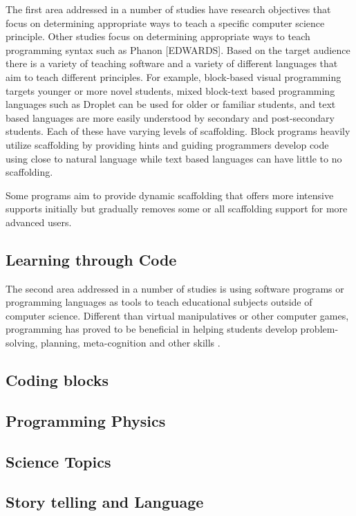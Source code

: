 \documentclass[12pt]{extarticle}
\begin{document}
The first area addressed in a number of studies have research objectives that focus on determining appropriate ways to teach a specific computer science principle.
Other studies focus on determining appropriate ways to teach programming syntax such as Phanon [EDWARDS].
Based on the target audience there is a variety of teaching software and a variety of different languages that aim to teach different principles. For example, block-based visual programming targets younger or more novel students, mixed block-text based programming languages such as Droplet can be used for older or familiar students, and text based languages are more easily understood by secondary and post-secondary students. Each of these have varying levels of scaffolding. Block programs heavily utilize scaffolding by providing hints and guiding programmers develop code using close to natural language while text based languages can have little to no scaffolding.

Some programs aim to provide dynamic scaffolding that offers more intensive supports initially but gradually removes some or all scaffolding support for more advanced users. 

    
\subsection*{Learning through Code}
The second area addressed in a number of studies is using software programs or programming languages as tools to teach educational subjects outside of computer science. Different than virtual manipulatives or other computer games, programming has proved to be beneficial in helping students develop problem-solving, planning, meta-cognition and other skills \cite{papadakis, fuchs}.   



\subsection{Coding blocks}\cite{}
\subsection{Programming Physics}\cite{sherin}

\subsection{Science Topics} \cite{guzdial}
\subsection{Story telling and Language} \cite{}
\end{document}
